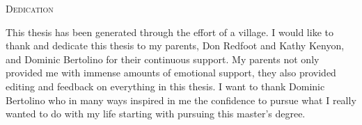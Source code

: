 \documentclass[12pt]{UIdahoMastersThesis}
\begin{document}
\newpage
 \vspace*{\fill}
 \begin{center}
   {\LARGE\textsc{Dedication}}
   
  This thesis has been generated through the effort of a village. I would like to thank and dedicate this thesis to my parents, Don Redfoot and Kathy Kenyon, and Dominic Bertolino for their continuous support. My parents not only provided me with immense amounts of emotional support, they also provided editing and feedback on everything in this thesis. I want to thank Dominic Bertolino who in many ways inspired in me the confidence to pursue what I really wanted to do with my life starting with pursuing this master's degree.
 \end{center}
 \vspace{\fill}
 \newpage

\tableofcontents

\newpage

\listoftables
\end{document}
